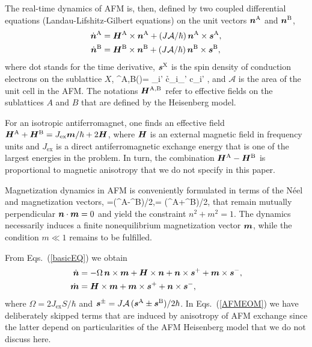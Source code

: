 The real-time dynamics of AFM is, then, defined by two coupled differential equations (Landau-Lifshitz-Gilbert equations) on the unit vectors $\boldsymbol{n}^\textrm{A}$ and $\boldsymbol{n}^\textrm{B}$, 
\beml
\label{basicEQ}
\begin{align}
\dot{\boldsymbol{n}}^\textrm{A} &= \boldsymbol{H}^\textrm{A}\times\boldsymbol{n}^\textrm{A}  + (J\mathcal{A}/\hbar)\,\boldsymbol{n}^\textrm{A}\times \boldsymbol{s}^\textrm{A},\\
\dot{\boldsymbol{n}}^\textrm{B}&= \boldsymbol{H}^\textrm{B}\times\boldsymbol{n}^\textrm{B} +(J\mathcal{A}/\hbar)\,\boldsymbol{n}^\textrm{B}\times \boldsymbol{s}^\textrm{B},
\end{align}
\eml
where dot stands for the time derivative, $\boldsymbol{s}^\textrm{X}$ is the spin density of conduction electrons on the sublattice $X$,
\be
{}^\textrm{A,B}()=  \s_{i\sigma\sigma'} \lt\la c\h_{i\sigma}\bb{\sigma}_{\sigma\sigma'} c\0_{i\sigma'} \rt\ra\;,
\e
and $\mathcal{A}$ is the area of the unit cell in the AFM. The notations $\boldsymbol{H}^\textrm{A,B}$ refer to effective fields on the sublattices $A$ and $B$ that are defined by the Heisenberg model. 

For an isotropic antiferromagnet, one finds an effective field \cite{Gomonay2014} $\boldsymbol{H}^\textrm{A}+\boldsymbol{H}^\textrm{B}= J_\textrm{ex}\boldsymbol{m}/\hbar+2\boldsymbol{H}$, where $\boldsymbol{H}$ is an external magnetic field in frequency units and $J_\textrm{ex}$ is a direct antiferromagnetic exchange energy that is one of the largest energies in the problem. In turn, the combination $\boldsymbol{H}^\textrm{A}-\boldsymbol{H}^\textrm{B}$ is proportional to magnetic anisotropy that we do not specify in this paper.  

Magnetization dynamics in AFM is conveniently formulated in terms of the N\'eel and magnetization vectors,
\be
{}=\lt(^\textrm{A}-^\textrm{B}\rt)/2,\qquad {}= \lt(^\textrm{A}+^\textrm{B}\rt)/2,
\e
that remain mutually perpendicular $\boldsymbol{n}\cdot \boldsymbol{m}=0$ and yield the constraint $n^2+m^2=1$. The dynamics necessarily induces a finite nonequilibrium magnetization vector $\boldsymbol{m}$, while the condition $m\ll 1$ remains to be fulfilled.  

From Eqs.~(\ref{basicEQ}) we obtain
\beml
\label{AFMEOM}
\begin{align}
\label{ndot}
\dot{\boldsymbol{n}} &= -\Omega\, \boldsymbol{n}\times\boldsymbol{m} +\boldsymbol{H}\times\boldsymbol{n}+\boldsymbol{n}\times\boldsymbol{s}^++\boldsymbol{m}\times\boldsymbol{s}^-,\\
\label{mdot}
\dot{\boldsymbol{m}} &= \boldsymbol{H}\times\boldsymbol{m}+\boldsymbol{m}\times\boldsymbol{s}^++\boldsymbol{n}\times\boldsymbol{s}^-,
\end{align}
\eml
where $\Omega=2J_\textrm{ex}S/\hbar$ and $\boldsymbol{s}^{\pm}= J \mathcal{A}\,(\boldsymbol{s}^\textrm{A}\pm\boldsymbol{s}^\textrm{B})/2\hbar$. In Eqs.~(\ref{AFMEOM}) we have deliberately skipped terms that are induced by anisotropy of AFM exchange since the latter depend on particularities of the AFM Heisenberg model that we do not discuss here.  

